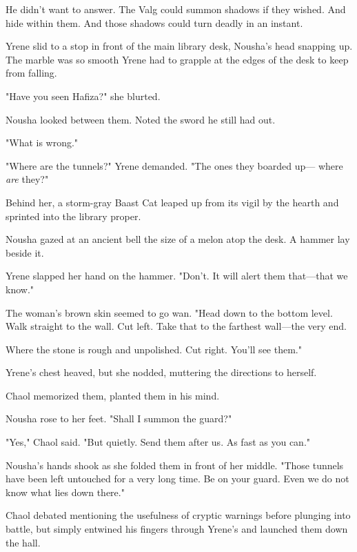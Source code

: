 He didn't want to answer. The Valg could summon shadows if they wished. And hide within them. And those shadows could turn deadly in an instant.

Yrene slid to a stop in front of the main library desk, Nousha's head snapping up. The marble was so smooth Yrene had to grapple at the edges of the desk to keep from falling.

"Have you seen Hafiza?" she blurted.

Nousha looked between them. Noted the sword he still had out.

"What is wrong."

"Where are the tunnels?" Yrene demanded. "The ones they boarded up--- where \emph{are} they?"

Behind her, a storm-gray Baast Cat leaped up from its vigil by the hearth and sprinted into the library proper.

Nousha gazed at an ancient bell the size of a melon atop the desk. A hammer lay beside it.

Yrene slapped her hand on the hammer. "Don't. It will alert them that---that we know."

The woman's brown skin seemed to go wan. "Head down to the bottom level. Walk straight to the wall. Cut left. Take that to the farthest wall---the very end.

Where the stone is rough and unpolished. Cut right. You'll see them."

Yrene's chest heaved, but she nodded, muttering the directions to herself.

Chaol memorized them, planted them in his mind.

Nousha rose to her feet. "Shall I summon the guard?"

"Yes," Chaol said. "But quietly. Send them after us. As fast as you can."

Nousha's hands shook as she folded them in front of her middle. "Those tunnels have been left untouched for a very long time. Be on your guard. Even we do not know what lies down there."

Chaol debated mentioning the usefulness of cryptic warnings before plunging into battle, but simply entwined his fingers through Yrene's and launched them down the hall.


